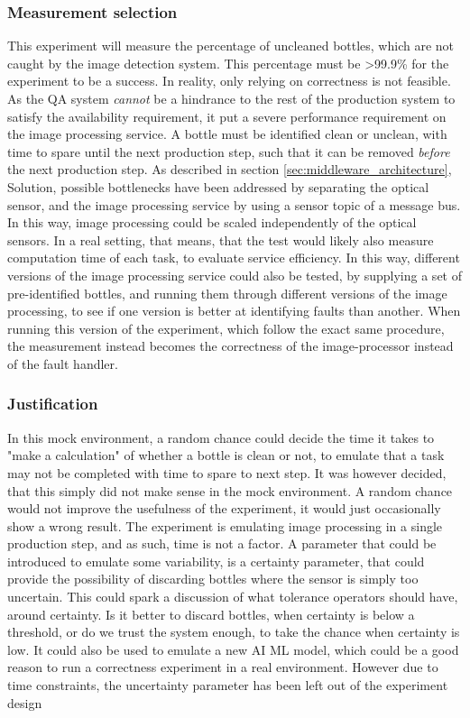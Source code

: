 \subsubsection{Measurement selection}
This experiment will measure the percentage of uncleaned bottles, which are not caught by the image detection system. This percentage must be \textgreater99.9\% for the experiment to be a success. In reality, only relying on correctness is not feasible. As the QA system \emph{cannot} be a hindrance to the rest of the production system to satisfy the availability requirement, it put a severe performance requirement on the image processing service. A bottle must be identified clean or unclean, with time to spare until the next production step, such that it can be removed \emph{before} the next production step. As described in section \ref{sec:middleware_architecture}, Solution, possible bottlenecks have been addressed by separating the optical sensor, and the image processing service by using a sensor topic of a message bus. In this way, image processing could be scaled independently of the optical sensors. In a real setting, that means, that the test would likely also measure computation time of each task, to evaluate service efficiency. In this way, different versions of the image processing service could also be tested, by supplying a set of pre-identified bottles, and running them through different versions of the image processing, to see if one version is better at identifying faults than another. When running this version of the experiment, which follow the exact same procedure, the measurement instead becomes the correctness of the image-processor instead of the fault handler.

\subsubsection{Justification}
In this mock environment, a random chance could decide the time it takes to "make a calculation" of whether a bottle is clean or not, to emulate that a task may not be completed with time to spare to next step. It was however decided, that this simply did not make sense in the mock environment. A random chance would not improve the usefulness of the experiment, it would just occasionally show a wrong result. The experiment is emulating image processing in a single production step, and as such, time is not a factor. A parameter that could be introduced to emulate some variability, is a certainty parameter, that could provide the possibility of discarding bottles where the sensor is simply too uncertain. This could spark a discussion of what tolerance operators should have, around certainty. Is it better to discard bottles, when certainty is below a threshold, or do we trust the system enough, to take the chance when certainty is low. It could also be used to emulate a new AI ML model, which could be a good reason to run a correctness experiment in a real environment. However due to time constraints, the uncertainty parameter has been left out of the experiment design

